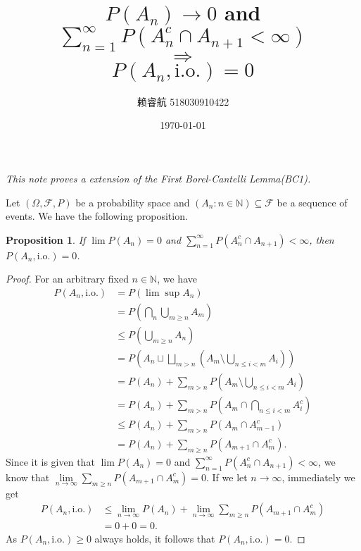 \documentclass[a4paper, linespread=1.5]{article}
\newtheorem{proposition}[theorem]{Proposition}
\newcommand{\Natural}{\mathbb{N}}
\begin{document}
    \title{$P(A_n) \rightarrow 0$ and $\sum_{n = 1}^{\infty} P(A_n^c \cap A_{n + 1} < \infty)$ \\ $\Rightarrow$ \\ $P(A_n, \textrm{i.o.}) = 0$}
    \author{赖睿航 518030910422}
    \date{\today}
    \maketitle
    
    \textit{This note proves a extension of the First Borel-Cantelli Lemma(BC1).}

    \medskip
    
    Let $(\Omega, \mathcal{F}, P)$ be a probability space and $(A_n \colon n \in \Natural) \subseteq \mathcal{F}$ be a sequence of events. We have the following proposition.
    \begin{proposition}
        If $\lim P(A_n) = 0$ and $\sum\limits_{n = 1}^{\infty} P(A_n^c \cap A_{n + 1}) < \infty$, then $P(A_n, \textrm{i.o.}) = 0$. \cite{Chandra2012}
    \end{proposition}

    \begin{proof}
        For an arbitrary fixed $n \in \Natural$, we have
        \begin{align*}
            P(A_n, \textrm{i.o.}) &= P(\lim \sup A_n) \\
            &= P(\bigcap_n \bigcup_{m \geqslant n} A_m) \\
            &\leqslant P(\bigcup_{m \geqslant n} A_n) \\
            &= P(A_n \sqcup \bigsqcup_{m > n}(A_m \setminus \bigcup_{n \leqslant i < m}A_i)) \\
            &= P(A_n) + \sum_{m > n} P(A_m \setminus \bigcup_{n \leqslant i < m}A_i) \\
            &= P(A_n) + \sum_{m > n} P(A_m \cap \bigcap_{n \leqslant i < m} A_i^c) \\
            &\leqslant P(A_n) + \sum_{m > n} P(A_m \cap A_{m - 1}^c) \\
            &= P(A_n) + \sum_{m \geqslant n} P(A_{m + 1} \cap A_m^c).
        \end{align*}
        Since it is given that $\lim P(A_n) = 0$ and $\sum\limits_{n = 1}^{\infty} P(A_n^c \cap A_{n + 1}) < \infty$, we know that $\lim\limits_{n \rightarrow \infty} \sum\limits_{m \geqslant n} P(A_{m + 1} \cap A_m^c) = 0$. If we let $n \rightarrow \infty$, immediately we get
        \begin{align*}
            P(A_n, \textrm{i.o.}) &\leqslant \lim_{n \rightarrow \infty} P(A_n) + \lim_{n \rightarrow \infty} \sum_{m \geqslant n} P(A_{m + 1} \cap A_m^c) \\
            &= 0 + 0 = 0.
        \end{align*}
        As $P(A_n, \textrm{i.o.}) \geqslant 0$ always holds, it follows that $P(A_n, \textrm{i.o.}) = 0$.
    \end{proof}
\end{document}
